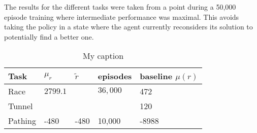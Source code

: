 The results for the different tasks were taken from a point during a 50,000 episode training where intermediate performance was maximal. This avoids taking the policy in a state where the agent currently reconsiders its solution to potentially find a better one.

\begin{table}[]
\centering
\begin{tabular}{@{}lllll@{}}
\toprule
\textbf{Task} & \textbf{$\mu_r$} & \textbf{$\widetilde{r}$} & \textbf{episodes} & \textbf{baseline} \textbf{$\mu(r)$} \\ \midrule
Race & $2799.1$ &  & $36,000$ & 472\\
Tunnel &  &  & & 120\\ 
Pathing & -480 & -480 & 10,000 & -8988\\ \bottomrule
\end{tabular}
\caption{My caption}
\label{my-label}
\end{table}
    
